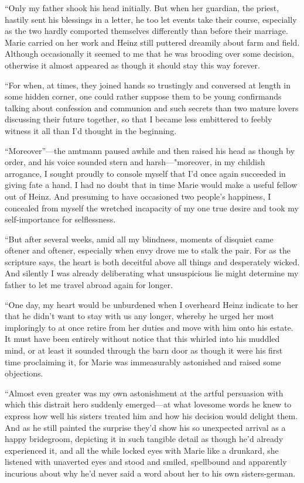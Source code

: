 \documentclass[12pt,a4paper]{article}
\begin{document}
“Only my father shook his head initially. But when her guardian, the priest, hastily sent his blessings in a letter, he too let events take their course, especially as the two hardly comported themselves differently than before their marriage. Marie carried on her work and Heinz still puttered dreamily about farm and field. Although occasionally it seemed to me that he was brooding over some decision, otherwise it almost appeared as though it should stay this way forever.

“For when, at times, they joined hands so trustingly and conversed at length in some hidden corner, one could rather suppose them to be young confirmands talking about confession and communion and such secrets than two mature lovers discussing their future together, so that I became less embittered to feebly witness it all than I’d thought in the beginning.

“Moreover”—the amtmann paused awhile and then raised his head as though by order, and his voice sounded stern and harsh—"moreover, in my childish arrogance, I sought proudly to console myself that I’d once again succeeded in giving fate a hand. I had no doubt that in time Marie would make a useful fellow out of Heinz. And presuming to have occasioned two people’s happiness, I concealed from myself the wretched incapacity of my one true desire and took my self-importance for selflessness.

“But after several weeks, amid all my blindness, moments of disquiet came oftener and oftener, especially when envy drove me to stalk the pair. For as the scripture says, the heart is both deceitful above all things and desperately wicked. And silently I was already deliberating what unsuspicious lie might determine my father to  let me travel abroad again for longer.

“One day, my heart would be unburdened when I overheard Heinz indicate to her that he didn’t want to stay with us any longer, whereby he urged her most imploringly to at once retire from her duties and move with him onto his estate. It must have been entirely without notice that this whirled into his muddled mind, or at least it sounded through the barn door as though it were his first time proclaiming it, for Marie was immeasurably astonished and raised some objections.

“Almost even greater was my own astonishment at the artful persuasion with which this distrait hero suddenly emerged—at what lovesome words he knew to express how well his sisters treated him and how his decision would delight them. And as he still painted the surprise they’d show his so unexpected arrival as a happy bridegroom, depicting it in such tangible detail as though he’d already experienced it, and all the while locked eyes with Marie like a drunkard, she listened with unaverted eyes and stood and smiled, spellbound and apparently incurious about why he’d never said a word about her to his own sisters-german.
\end{document}
